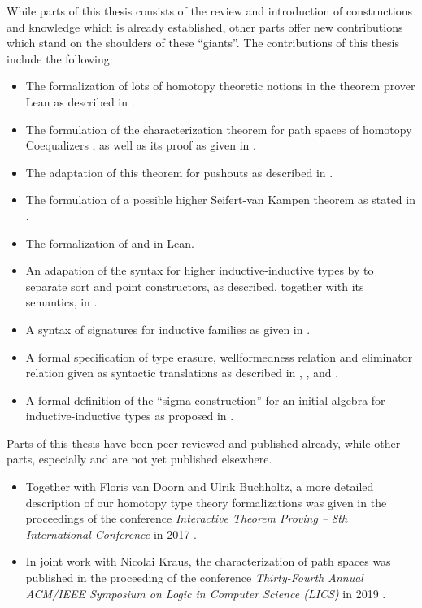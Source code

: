 While parts of this thesis consists of the review and introduction of constructions
and knowledge which is already established,
other parts offer new contributions which stand on the shoulders of these ``giants''.
The contributions of this thesis include the following:
\begin{itemize}
\item The formalization of lots of homotopy theoretic notions in the theorem prover
Lean as described in .
\item The formulation of the characterization theorem for path spaces
of homotopy Coequalizers , as well as its proof
as given in .
\item The adaptation of this theorem for pushouts as described in .
\item The formulation of a possible higher Seifert-van Kampen theorem
as stated in .
\item The formalization of  and 
in Lean.
\item An adapation of the syntax for higher inductive-inductive types by
\citet{ambrussyntax} to separate sort and point constructors, as described, together with
its semantics, in .
\item A syntax of signatures for inductive families as given in .
\item A formal specification of type erasure, wellformedness relation and eliminator
relation given as syntactic translations as described in ,
, and .
\item A formal definition of the ``sigma construction'' for an initial algebra
for inductive-inductive types as proposed in .
\end{itemize}

Parts of this thesis have been peer-reviewed and published already, while
other parts, especially  and  are not yet published
elsewhere.
\begin{itemize}
\item Together with Floris van Doorn and Ulrik Buchholtz, a more
detailed description of our homotopy type theory formalizations was given
in the proceedings of the conference \emph{Interactive Theorem Proving -- 8th International Conference}
in 2017 \citep{leanhott}.
\item In joint work with Nicolai Kraus, the characterization of path spaces
was published in the proceeding of the conference
\emph{Thirty-Fourth Annual ACM/IEEE Symposium on
Logic in Computer Science (LICS)} in 2019 \citep{paths}.
\end{itemize}

